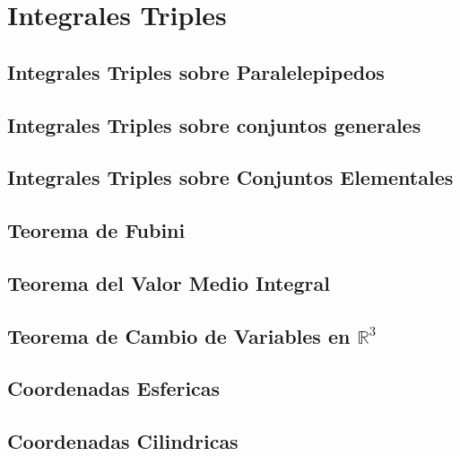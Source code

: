 \documentclass{report}
\begin{document}
       
  

     
       
     \section{Integrales Triples}
          \subsection{Integrales Triples sobre Paralelepipedos}
          

           \subsection{Integrales Triples sobre conjuntos generales}
                 


           \subsection{Integrales Triples sobre Conjuntos Elementales}
                 

           \subsection{Teorema de Fubini}
               


           \subsection{Teorema del Valor Medio Integral}
                   
              
           \subsection{Teorema de Cambio de Variables en $\mathbb{R}^{3}$}
                 

                 \subsection{Coordenadas Esfericas}
                 

               \subsection{Coordenadas Cilindricas}
                 
          
\end{document}
